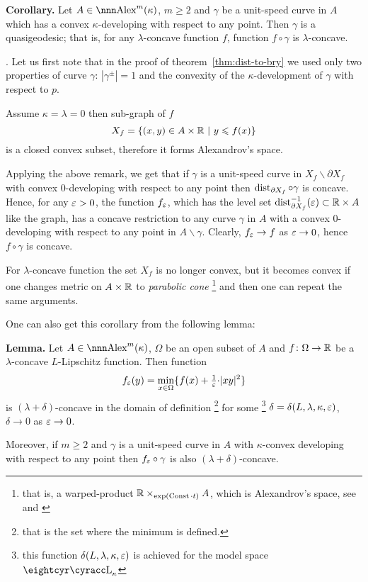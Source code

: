 \documentclass{article}
\begin{document}
\begin{thm}{\bf Corollary.} \label{cor:eq-qg}
Let $A\in\Alex^m(\kappa)$, $m\ge2$ and $\gamma$ be a unit-speed curve in $A$
which has a convex $\kappa$-developing with respect to any point.
Then $\gamma$ is a quasigeodesic;
that is, for any $\lambda$-concave function $f$,
function $f\circ\gamma$ is $\lambda$-concave.
\end{thm}

\Proof.  Let us first note that in the proof of theorem~\ref{thm:dist-to-bry} we
used only two properties of curve $\gamma$:
$|\gamma^\pm|=1$ and the convexity of the $\kappa$-development of $\gamma$ with respect
to $p$.

Assume $\kappa=\lambda=0$ then sub-graph of $f$
$$X_f=\{(x,y)\in A\times\mathbb{R}\ |\ y\leqslant f(x)\}$$ 
is a closed convex subset, therefore it forms Alexandrov's space.

Applying the above remark, we get that if $\gamma$ is a unit-speed curve in
$X_f\backslash \partial X_f$ with convex $0$-developing with respect to any
point then $\operatorname{dist}_{\partial X_f}\circ\gamma$ is concave.
 Hence, for any $\varepsilon>0$, the function $f_\varepsilon$, which has the level set $\operatorname{dist}_{\partial X_f}^{-1}(\varepsilon)\subset \mathbb{R}\times A$ like the graph, has a concave restriction to any curve $\gamma$ in
$A$ with a convex $0$-developing with respect to any
point in $A\backslash\gamma$. 
Clearly, $f_\varepsilon\to f$ as $\varepsilon\to 0$, hence $f\circ\gamma$ is concave. 

For $\lambda$-concave function the set $X_f$ is no longer convex, but it becomes convex if one changes metric on $A\times\mathbb{R}$ to \emph{parabolic cone}%
\footnote{\label{par-cone} that is, a warped-product
$\mathbb{R}\times_{\exp(\operatorname{Const}{\cdot}t)} A$, which is Alexandrov's space, see \cite[4.3.3]{BGP} and \cite{alexander-bishop:worps}} 
and then one can repeat the same arguments.\qeds


 One can also get this corollary from the following lemma:

\begin{thm}{\bf Lemma.}\label{f_eps}
Let $A\in\Alex^m(\kappa)$, $\Omega$ be an open subset of $A$ and
 $f\colon\Omega\to\mathbb{R}$ be a $\lambda$-concave $L$-Lipschitz function.
Then function
$$f_\varepsilon(y)=\min_{x\in\Omega}\{f(x)+\tfrac1{\varepsilon}{\cdot}|x y|^2\}$$
is $(\lambda+\delta)$-concave in the domain of definition%
\footnote{that is the set where the minimum is defined.} 
for some%
\footnote{this function $\delta(L,\lambda,\kappa,\varepsilon)$ is achieved for the model space $\Lobm_\kappa$} 
$\delta=\delta(L,\lambda,\kappa,\varepsilon)$, $\delta\to0$ as $\varepsilon\to 0$.

Moreover, if $m\ge 2$ and $\gamma$ is a unit-speed curve in $A$ with $\kappa$-convex developing with respect to any point then 
$f_\varepsilon\circ\gamma$ is also $(\lambda+\delta)$-concave.
\end{thm}
\end{document}
